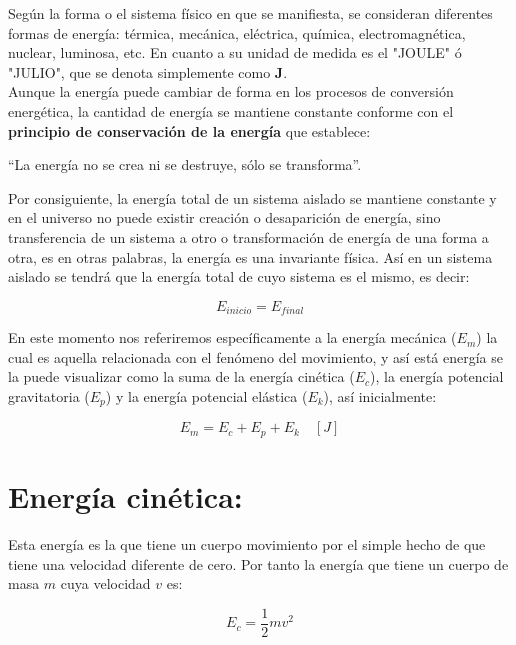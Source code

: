 \documentclass[a5paper,pagesize,10pt,bibtotoc,pointlessnumbers,
normalheadings,DIV=9,fleqn,x11names,table,twoside=false]{scrbook}
\begin{document}
Según la forma o el sistema físico en que se manifiesta, se consideran diferentes formas de energía: térmica, mecánica, eléctrica, 
química, electromagnética, nuclear, luminosa, etc. En cuanto a su unidad de medida es el "JOULE" ó "JULIO", que se denota 
simplemente como \textbf{J}.\\

Aunque la energía puede cambiar de forma en los procesos de conversión energética, la cantidad de energía se mantiene constante 
conforme con el \textbf{principio de conservación de la energía} que establece:

\begin{tcolorbox}
``La energía no se crea ni se destruye, sólo se transforma''. 
\end{tcolorbox}

Por consiguiente, la energía total de un sistema aislado se mantiene constante y en el universo no puede existir creación o 
desaparición de energía, sino transferencia de un sistema a otro o transformación de energía de una forma a otra, es en otras 
palabras, la energía es una invariante física. Así en un sistema aislado se tendrá que la energía total de cuyo sistema es el 
mismo, es decir:

\begin{equation}
E_{inicio} = E_{final}
\end{equation}

En este momento nos referiremos específicamente a la energía mecánica ($E_m$) la cual es aquella relacionada con el fenómeno del 
movimiento, y así está energía se la puede visualizar como la suma de la energía cinética ($E_c$), la energía potencial 
gravitatoria ($E_p$) y la energía potencial elástica ($E_k$), así inicialmente:

\begin{equation}
E_m = E_c + E_p + E_k \quad [J]
\end{equation} 

\section{Energía cinética:}

Esta energía es la que tiene un cuerpo movimiento por el simple hecho de que tiene una velocidad diferente de cero. Por tanto la 
energía que tiene un cuerpo de masa $m$ cuya velocidad $v$ es:

\begin{equation}
E_c = \frac{1}{2}mv^2
\end{equation}
\end{document}
